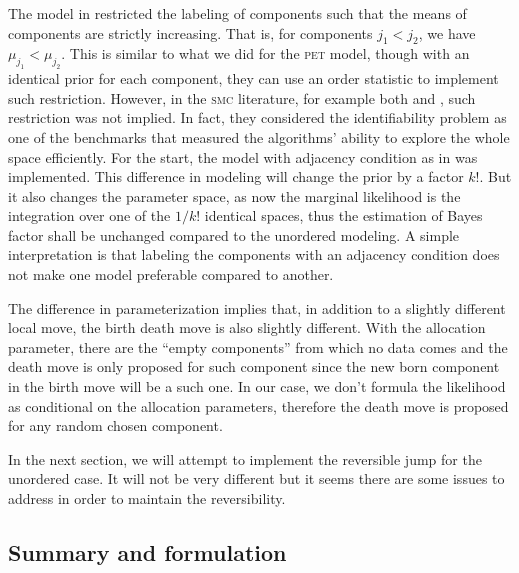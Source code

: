 \documentclass[11pt, bib, fontset = Minion]{marticle}
\def\pet{\textsc{pet}\xspace}
\def\smc{\textsc{smc}\xspace}
\begin{document}
  The model in \textcite{Richardson:1997ea} restricted the labeling of
  components such that the means of components are strictly increasing. That
  is, for components $j_1 < j_2$, we have $\mu_{j_1} < \mu_{j_2}$. This is
  similar to what we did for the \pet model, though with an identical prior
  for each component, they can use an order statistic to implement such
  restriction. However, in the \smc literature, for example both
  \textcite{DelMoral:2006hc} and \textcite{Jasra:2007in}, such restriction was
  not implied. In fact, they considered the identifiability problem as one of
  the benchmarks that measured the algorithms' ability to explore the whole
  space efficiently. For the start, the model with adjacency condition as in
  \textcite{Richardson:1997ea} was implemented. This difference in modeling
  will change the prior by a factor $k!$. But it also changes the parameter
  space, as now the marginal likelihood is the integration over one of the
  $1/k!$ identical spaces, thus the estimation of Bayes factor shall be
  unchanged compared to the unordered modeling. A simple interpretation is
  that labeling the components with an adjacency condition does not make one
  model preferable compared to another.

  The difference in parameterization implies that, in addition to a slightly
  different local move, the birth death move is also slightly different. With
  the allocation parameter, there are the ``empty components'' from which no
  data comes and the death move is only proposed for such component since the
  new born component in the birth move will be a such one. In our case, we
  don't formula the likelihood as conditional on the allocation parameters,
  therefore the death move is proposed for any random chosen component.

  In the next section, we will attempt to implement the reversible jump for
  the unordered case. It will not be very different but it seems there are
  some issues to address in order to maintain the reversibility.

  \subsection{Summary and formulation}
\end{document}
